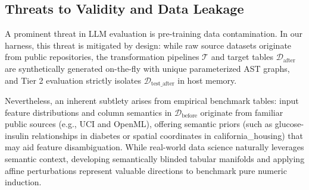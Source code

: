 \documentclass[sigconf]{acmart}
\begin{document}
\subsection{Threats to Validity and Data Leakage}
A prominent threat in LLM evaluation is pre-training data contamination. In our harness, this threat is mitigated by design: while raw source datasets originate from public repositories, the transformation pipelines $\mathcal{T}$ and target tables $\mathcal{D}_{\text{after}}$ are synthetically generated on-the-fly with unique parameterized AST graphs, and Tier 2 evaluation strictly isolates $\mathcal{D}_{\text{test\_after}}$ in host memory.

Nevertheless, an inherent subtlety arises from empirical benchmark tables: input feature distributions and column semantics in $\mathcal{D}_{\text{before}}$ originate from familiar public sources (e.g., UCI and OpenML), offering semantic priors (such as glucose-insulin relationships in \textsf{diabetes} or spatial coordinates in \textsf{california\_housing}) that may aid feature disambiguation. While real-world data science naturally leverages semantic context, developing semantically blinded tabular manifolds and applying affine perturbations represent valuable directions to benchmark pure numeric induction.
\end{document}

